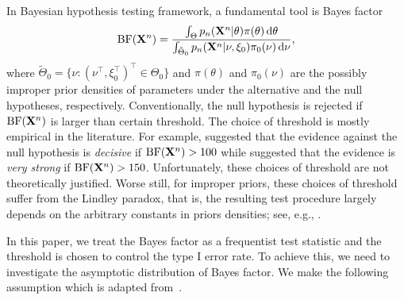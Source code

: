 \documentclass[11pt]{article}
\theoremstyle{plain}
\theoremstyle{definition}
\theoremstyle{remark}
\begin{document}
In Bayesian hypothesis testing framework, a fundamental tool is Bayes factor
\begin{equation*}
    \text{BF}(\mathbf{X}^{n})=
    \frac{\int_{\Theta} p_n(\mathbf{X}^{n}|\theta)\pi(\theta)\, \mathrm d\theta}{\int_{\tilde{\Theta}_0}p_n(\mathbf{X}^{n}|\nu,\xi_0)\pi_0(\nu)\, \mathrm d\nu},
\end{equation*}
where $\tilde{\Theta}_0=\{\nu: (\nu^\top ,\xi_0^\top )^\top \in \Theta_0\}$ and $\pi(\theta)$ and $\pi_0(\nu)$ are the possibly improper prior densities of parameters under the alternative and the  null hypotheses, respectively.
Conventionally, the null hypothesis is rejected if $\text{BF}(\mathbf{X}^n)$ is larger than certain threshold.
The choice of threshold is mostly empirical in the literature.
For example, \cite{Jeffreys1961} suggested that the evidence against the null hypothesis is \emph{decisive} if $\text{BF}(\mathbf{X}^n)>100$ while \cite{Robert1995Bayes} suggested that the evidence is \emph{very strong} if $\text{BF}(\mathbf{X}^n) > 150$.
Unfortunately, these choices of threshold  are not theoretically justified.
Worse still, for improper priors, these choices of threshold suffer from the Lindley paradox, that is, the resulting test procedure largely depends on the arbitrary constants in priors densities; see, e.g., \cite{Shafer1982}.

In this paper, we treat the Bayes factor as a frequentist test statistic and the threshold is chosen to control the type I error rate.
To achieve this, we need to investigate the asymptotic distribution of Bayes factor.
We make the following assumption which is adapted from~\cite{Kleijn2012The}.
\end{document}
